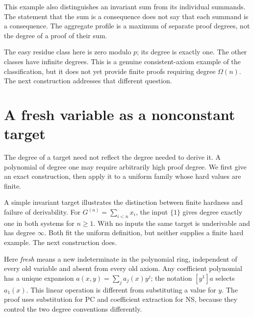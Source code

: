 \documentclass[11pt,a4paper,oneside,openany]{book}
\theoremstyle{definition}\newtheorem{definition}[theorem]{Definition}
\theoremstyle{remark}\newtheorem{remark}[theorem]{Remark}
\numberwithin{equation}{chapter}
\begin{document}
This example also distinguishes an invariant sum from its individual
summands. The statement that the sum is a consequence does not say
that each summand is a consequence. The aggregate profile is a maximum
of separate proof degrees, not the degree of a proof of their sum.

The easy residue class here is zero modulo $p$; its degree is exactly
one. The other classes have infinite degrees. This is a genuine
consistent-axiom example of the classification, but it does not yet
provide finite proofs requiring degree $\Omega(n)$. The next
construction addresses that different question.

\section{A fresh variable as a nonconstant target}\label{tx:sec:target-examples}
The degree of a target need not reflect the degree needed to derive it.
A polynomial of degree one may require arbitrarily high proof degree.
We first give an exact construction, then apply it to a uniform family
whose hard values are finite.

A simple invariant target illustrates the distinction between finite
hardness and failure of derivability. For $G^{(n)}=\sum_{i<n}x_i$, the input
$\{1\}$ gives degree exactly one in both systems for $n\ge1$. With no
inputs the same target is underivable and has degree $\infty$. Both
fit the uniform definition, but neither supplies a finite hard example.
The next construction does.

Here \emph{fresh} means a new indeterminate in the polynomial ring,
independent of every old variable and absent from every old axiom.
Any coefficient polynomial has a unique expansion
$a(x,y)=\sum_j a_j(x)y^j$; the notation $[y^1]a$ selects $a_1(x)$.
This linear operation is different from substituting a value for $y$.
The proof uses substitution for PC and coefficient extraction for NS,
because they control the two degree conventions differently.
\end{document}
